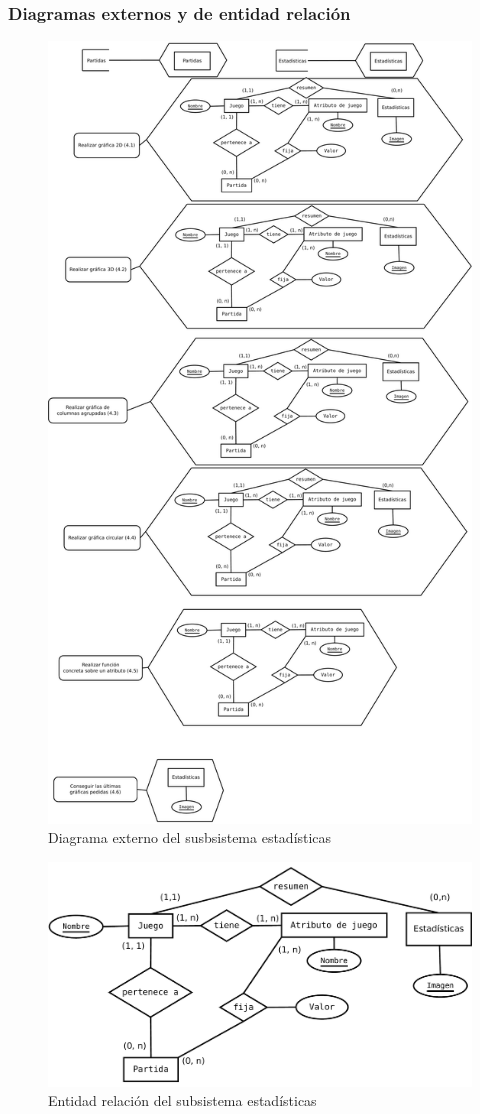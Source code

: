 \newpage

\subsubsection{Diagramas externos y de entidad relación}

\begin{figure}[H]
	\centering
	\includegraphics[width=0.6\linewidth]{../Diagramas/pdf/ExternoEstadisticas.pdf}
	\caption{Diagrama externo del susbsistema estadísticas}
	\label{fig:ExternoEstadisticas}
\end{figure}

\begin{figure}[H]
	\centering
	\includegraphics[width=0.7\linewidth]{../Diagramas/pdf/EREstadistica.pdf}
	\caption{Entidad relación del subsistema estadísticas}
	\label{fig:EntidadRelacion}
\end{figure}

\newpage